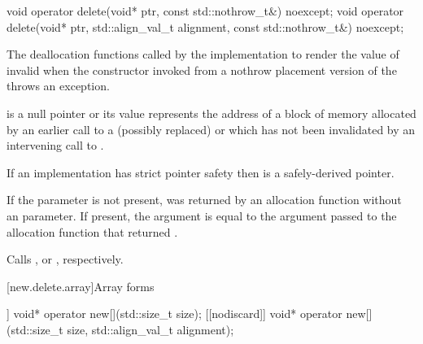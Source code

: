 %
\begin{itemdecl}
void operator delete(void* ptr, const std::nothrow_t&) noexcept;
void operator delete(void* ptr, std::align_val_t alignment, const std::nothrow_t&) noexcept;
\end{itemdecl}

\begin{itemdescr}
\pnum
\effects
The
deallocation functions
called by the implementation
to render the value of  invalid
when the constructor invoked from a nothrow
placement version of the  throws an exception.

\pnum
\replaceable
{}

\pnum
\expects
{} is a null pointer or
its value represents the address of
a block of memory allocated by
an earlier call to a (possibly replaced)
or
which has not been invalidated by an intervening call to
.

\pnum
\expects
If an implementation has strict pointer safety
then  is a safely-derived pointer.

\pnum
\expects
If the  parameter is not present,
 was returned by an allocation function
without an  parameter.
If present, the  argument
is equal to the  argument
passed to the allocation function that returned .

\pnum
{}
Calls ,
or ,
respectively.
\end{itemdescr}

[new.delete.array]{Array forms}

%
\begin{itemdecl}
[[nodiscard]] void* operator new[](std::size_t size);
[[nodiscard]] void* operator new[](std::size_t size, std::align_val_t alignment);
\end{itemdecl}

